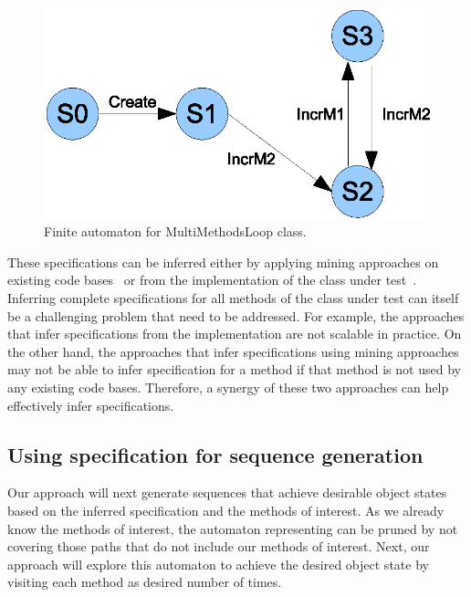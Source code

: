 \begin{figure}[t]
\centering
\includegraphics[scale=0.60,clip]{figs/MultiMethodsLoopFsa1.eps}
\caption{\label{fig:loopfsa}Finite automaton for MultiMethodsLoop class.}
\end{figure}

These specifications can be inferred either by applying mining approaches on existing code bases~\cite{thummalapenta09:mseqgen} or from the implementation of the class under test~\cite{whaley02:interface}. Inferring complete specifications for all methods of the class under test can itself be a challenging problem that need to be addressed. For example, the approaches that infer specifications from the implementation are not scalable in practice. On the other hand, the approaches that infer specifications using mining approaches may not be able to infer specification for a method if that method is not used by any existing code bases. Therefore, a synergy of these two approaches can help effectively infer specifications.

\subsection{Using specification for sequence generation}

Our approach will next generate sequences that achieve desirable object states based on the inferred specification and the methods of interest. As we already know the methods of interest, the automaton representing can be pruned by not covering those paths that do not include our methods of interest. Next, our approach will explore this automaton to achieve the desired object state by visiting each method as desired number of times.



